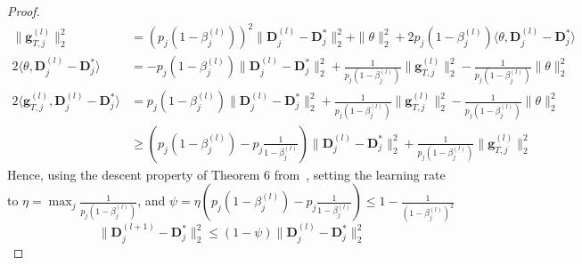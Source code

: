 \documentclass[10pt]{article} %
\newcommand{\D}{{\bm D}}
\newcommand{\g}{{\bm g}}
\begin{document}
\begin{proof}
\begin{equation}
\begin{aligned}
  \| \g_{T, j}^{(l)} \|_2^2 &= (p_j (1 - \beta_j^{(l)}))^2 \| \D_j^{(l)}
    - \D_j^{\ast} \|_2^2 + \|\theta\|_2^2 + 2 p_j (1 - \beta_j^{(l)}) \langle \theta, \D_j^{(l)}
    - \D_j^{\ast} \rangle\\
2 \langle \theta, \D_j^{(l)}
    - \D_j^{\ast} \rangle &= - p_j (1 - \beta_j^{(l)}) \| \D_j^{(l)} 
    - \D_j^{\ast} \|_2^2 + \frac{1}{p_j (1 - \beta_j^{(l)})} \| \g_{T, j}^{(l)} \|_2^2 - \frac{1}{p_j (1 - \beta_j^{(l)})} \|\theta\|_2^2\\
2 \langle \g_{T, j}^{(l)}, \D_j^{(l)}
    - \D_j^{\ast} \rangle &= p_j (1 - \beta_j^{(l)}) \| \D_j^{(l)} 
    - \D_j^{\ast} \|_2^2 + \frac{1}{p_j (1 - \beta_j^{(l)})} \| \g_{T, j}^{(l)} \|_2^2 - \frac{1}{p_j (1 - \beta_j^{(l)})} \|\theta\|_2^2\\
& \geq (p_j (1 - \beta_j^{(l)}) - p_j \frac{1}{1 - \beta_j^{(l)}}) \| \D_j^{(l)} 
    - \D_j^{\ast} \|_2^2 + \frac{1}{p_j (1 - \beta_j^{(l)})} \| \g_{T, j}^{(l)} \|_2^2
\end{aligned}
\end{equation}
Hence, using the descent property of Theorem 6 from~\citep{arora2015sparsecoding}, setting the learning rate to $\eta = \max_j \frac{1}{p_j (1 - \beta_j^{(l)})}$, and $\psi = \eta (p_j (1 - \beta_j^{(l)}) - p_j \frac{1}{1 - \beta_j^{(l)}}) \leq 1 - \frac{1}{(1 - \beta_j^{(l)})^2}$
\begin{equation}
    \| \D_j^{(l+1)} - \D_j^{\ast} \|_2^2 \leq (1 - \psi)   \| \D_j^{(l)} - \D_j^{\ast} \|_2^2 
\end{equation}
\end{proof}
%
\dictfixededec*
%
\end{document}
